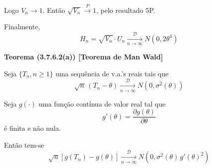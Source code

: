 Logo $V_n \to 1$. Então $\sqrt{V_n} \xrightarrow{P} 1$, pelo resultado 5P.

Finalmente,
\begin{equation}
H_n = \sqrt{V_n} \cdot U_n \xrightarrow[n \to \infty]{\mathcal{D}} N(0, 2\theta^4)
\end{equation}

\textbf{Teorema (3.7.6.2(a)) [Teorema de Man Wald]}

Seja $\{T_n, n \geq 1\}$ uma sequência de v.a.'s reais tais que
\begin{equation}
\sqrt{n} \, (T_n - \theta) \xrightarrow[n \to \infty]{\mathcal{D}} N\left(0, \sigma^2(\theta)\right)
\end{equation}

Seja $g(\cdot)$ uma função contínua de valor real tal que
\begin{equation}
g'(\theta) = \frac{\partial g(\theta)}{\partial \theta}
\end{equation}
é finita e não nula.

Então tem-se
\begin{equation}
\sqrt{n} \left[ g(T_n) - g(\theta) \right] \xrightarrow[n \to \infty]{\mathcal{D}} N\left(0, \sigma^2(\theta) \, g'(\theta)^2 \right)
\end{equation}